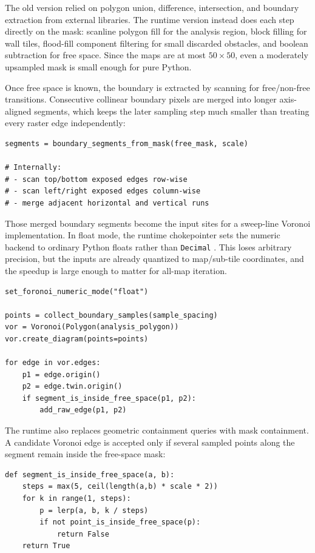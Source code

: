 \documentclass[10pt,sigconf,nonacm]{acmart}
\newcommand{\code}[1]{{%
  \def\_{\char`\_\discretionary{}{}{}}%
  \texttt{\small #1}%
}}
\begin{document}
The old version relied on polygon union, difference, intersection, and
boundary extraction from external libraries. The runtime version instead
does each step directly on the mask: scanline polygon fill for the analysis
region, block filling for wall tiles, flood-fill component filtering for
small discarded obstacles, and boolean subtraction for free space. Since
the maps are at most $50\times50$, even a moderately upsampled mask is
small enough for pure Python.

Once free space is known, the boundary is extracted by scanning for
free/non-free transitions. Consecutive collinear boundary pixels are merged
into longer axis-aligned segments, which keeps the later sampling step much
smaller than treating every raster edge independently:

\begin{lstlisting}
segments = boundary_segments_from_mask(free_mask, scale)

# Internally:
# - scan top/bottom exposed edges row-wise
# - scan left/right exposed edges column-wise
# - merge adjacent horizontal and vertical runs
\end{lstlisting}

Those merged boundary segments become the input sites for a sweep-line Voronoi implementation. In float mode, the runtime
chokepointer sets the numeric backend to ordinary Python floats rather
than \code{Decimal}. This loses arbitrary precision, but the inputs are
already quantized to map/sub-tile coordinates, and the speedup is large
enough to matter for all-map iteration.

\begin{lstlisting}
set_foronoi_numeric_mode("float")

points = collect_boundary_samples(sample_spacing)
vor = Voronoi(Polygon(analysis_polygon))
vor.create_diagram(points=points)

for edge in vor.edges:
    p1 = edge.origin()
    p2 = edge.twin.origin()
    if segment_is_inside_free_space(p1, p2):
        add_raw_edge(p1, p2)
\end{lstlisting}

The runtime also replaces geometric containment queries with mask
containment. A candidate Voronoi edge is accepted only if several sampled
points along the segment remain inside the free-space mask:

\begin{lstlisting}
def segment_is_inside_free_space(a, b):
    steps = max(5, ceil(length(a,b) * scale * 2))
    for k in range(1, steps):
        p = lerp(a, b, k / steps)
        if not point_is_inside_free_space(p):
            return False
    return True
\end{lstlisting}
\end{document}

